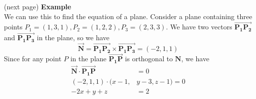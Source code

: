 \documentclass{report}
\begin{document}
(next page)
\newpage
\noindent\textbf{Example}\\
We can use this to find the equation of a plane. Consider a plane 
containing three points $P_1=(1,3,1), P_2=(1,2,2), P_3=(2,3,3)$. We have two vectors   
$\overrightarrow{\mathbf{P_1P_2}}$ and $\overrightarrow{\mathbf{P_1P_3}}$ in the plane, 
so we have 
\begin{equation*}
\overrightarrow{\mathbf{N}}=\overrightarrow{\mathbf{P_1P_2}}\times\overrightarrow{\mathbf{P_1P_3}}
=(-2,1,1)
\end{equation*}
Since for any point $P$ in the plane $\overrightarrow{\mathbf{P_1P}}$ is orthogonal to $\mathbf{N}$, we have
\begin{align*}
\overrightarrow{\mathbf{N}}\cdot\overrightarrow{\mathbf{P_1P}}&=0\\
(-2,1,1)\cdot(x-1,&y-3,z-1)=0\\
-2x+y+z&=2
\end{align*}
\newpage
\end{document}
